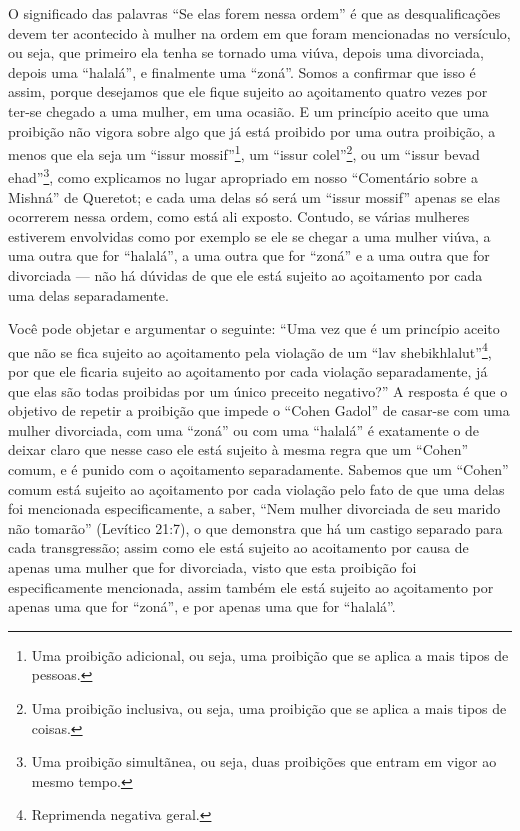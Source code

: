 O significado das palavras ``Se elas forem nessa ordem'' é que as
desqualificações devem ter acontecido à mulher na ordem em que foram
mencionadas no versículo, ou seja, que primeiro ela tenha se tornado uma
viúva, depois uma divorciada, depois uma ``halalá'', e finalmente uma
``zoná''. Somos a confirmar que isso é assim, porque desejamos que ele
fique sujeito ao açoitamento quatro vezes por ter-se chegado a uma
mulher, em uma ocasião. E um princípio aceito que uma proibição não
vigora sobre algo que já está proibido por uma outra proibição, a menos
que ela seja um ``issur mossif''\footnote{Uma proibição adicional, ou seja, uma proibição que se aplica a
mais tipos de pessoas.}, um ``issur
colel''\footnote{Uma proibição inclusiva, ou seja, uma proibição que se aplica a
mais tipos de coisas.}, ou um ``issur bevad
ehad''\footnote{Uma proibição simultãnea, ou seja, duas proibições que entram em
  vigor ao mesmo tempo.}, como explicamos no lugar apropriado em
nosso ``Comentário sobre a Mishná'' de Queretot; e cada uma delas só
será um ``issur mossif'' apenas se elas ocorrerem nessa ordem, como está
ali exposto. Contudo, se várias mulheres estiverem envolvidas como por
exemplo se ele se chegar a uma mulher viúva, a uma outra que for
``halalá'', a uma outra que for ``zoná'' e a uma outra que for
divorciada --- não há dúvidas de que ele está sujeito ao açoitamento por
cada uma delas separadamente.

Você pode objetar e argumentar o seguinte: ``Uma vez que é um princípio
aceito que não se fica sujeito ao açoitamento pela violação de um ``lav
shebikhlalut''\footnote{Reprimenda negativa geral.}, por que ele ficaria sujeito ao
açoitamento por cada violação separadamente, já que elas são todas
proibidas por um único preceito negativo?'' A resposta é que o objetivo
de repetir a proibição que impede o ``Cohen Gadol'' de casar-se com uma
mulher divorciada, com uma ``zoná'' ou com uma ``halalá'' é exatamente o
de deixar claro que nesse caso ele está sujeito à mesma regra que um
``Cohen'' comum, e é punido com o açoitamento separadamente. Sabemos
que um ``Cohen'' comum está sujeito ao açoitamento por cada violação
pelo fato de que uma delas foi mencionada especificamente, a saber,
``Nem mulher divorciada de seu marido não tomarão'' (Levítico 21:7), o
que demonstra que há um castigo separado para cada transgressão; assim
como ele está sujeito ao acoitamento por causa de apenas uma mulher que
for divorciada, visto que esta proibição foi especificamente mencionada,
assim também ele está sujeito ao açoitamento por apenas uma que for
``zoná'', e por apenas uma que for ``halalá''.


